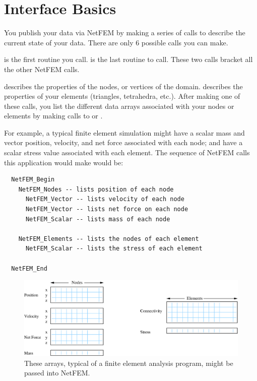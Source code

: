 \documentclass[10pt]{article}
\begin{document}
\section{Interface Basics}

You publish your data via NetFEM by making a series of
calls to describe the current state of your data.  
There are only 6 possible calls you can make.

 is the first routine you call.
 is the last routine to call.  These
two calls bracket all the other NetFEM calls.

 describes the properties of the
nodes, or vertices of the domain.  
describes the properties of your elements (triangles,
tetrahedra, etc.).  After making one of these calls,
you list the different data arrays associated with your 
nodes or elements by making calls to  
or .

For example, a typical finite element simulation might
have a scalar mass and vector position, velocity, and net force
associated with each node; and have a scalar stress value
associated with each element.  The sequence of NetFEM calls
this application would make would be:

\begin{verbatim}
  NetFEM_Begin
    NetFEM_Nodes -- lists position of each node
      NetFEM_Vector -- lists velocity of each node
      NetFEM_Vector -- lists net force on each node
      NetFEM_Scalar -- lists mass of each node
    
    NetFEM_Elements -- lists the nodes of each element
      NetFEM_Scalar -- lists the stress of each element
  
  NetFEM_End
\end{verbatim}

\begin{figure}[h]
\begin{center}
\includegraphics[width=5in]{fig/example}
\end{center}
\caption{These arrays, typical of a finite element analysis
program, might be passed into NetFEM.}
\label{fig:example}
\end{figure}
\end{document}
